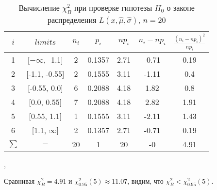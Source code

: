 \begin{table}[H]
	\centering
	\begin{tabular}{| c | c | c | c | c | c | c |}
		\hline
		$i$ & $limits$         &   $n_i$ &    $p_i$ &   $np_i$ &   $n_i - np_i$ &   $\frac{(n_i-np_i)^2}{np_i}$ \\
		\hline
		1 & [$-\infty$, -1.1] &     2 & 0.1357 &   2.71 &        -0.71 &                        0.19 \\
		2 & [-1.1, -0.55]  &    	 2 & 0.1555 &   3.11 &        -1.11 &                        0.4  \\
		3 & [-0.55, 0.0]   &     6 & 0.2088 &   4.18 &         1.82 &                        0.8  \\
		4 & [0.0, 0.55]    &    7 & 0.2088 &   4.18 &         2.82 &                        1.91 \\
		5 & [0.55, 1.1]    &     1 & 0.1555 &   3.11 &        -2.11 &                        1.43 \\
		6 & [1.1,  $\infty$]   &    2 & 0.1357 &   2.71 &        -0.71 &                        0.19 \\
		$\sum$ & $-$              &    20 & 1      &  20    &        -0    &                        4.91 \\
		\hline
	\end{tabular}
	\caption{ Вычисление $\chi^{2}_{B}$ при проверке гипотезы $H_{0}$ о законе распределения $L(x,\hat{\mu}, \hat{\sigma})$, $n=20$},
	\label{tab:laplace_chi_2}
\end{table}
Сравнивая $\chi^{2}_{B} = 4.91$ и $\chi^{2}_{0.95}(5) \approx 11.07$, видим, что $\chi^{2}_{B} < \chi^{2}_{0.95}(5)$.



	
